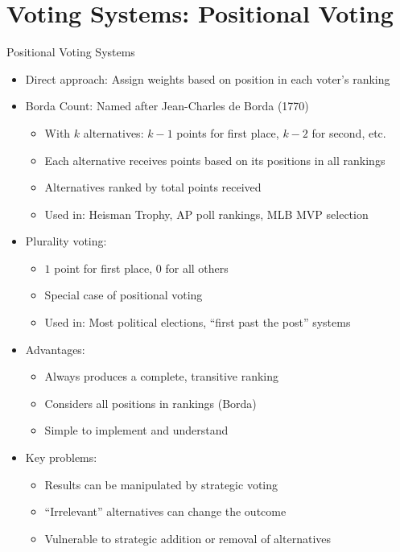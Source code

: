 \documentclass[10pt]{beamer}
\begin{document}
\section{Voting Systems: Positional Voting}

\begin{frame}{Positional Voting Systems}
  \begin{itemize}[<+->]
    \item Direct approach: Assign weights based on position in each voter's ranking
    \item Borda Count: Named after Jean-Charles de Borda (1770)
      \begin{itemize}
        \item With $k$ alternatives: $k-1$ points for first place, $k-2$ for second, etc.
        \item Each alternative receives points based on its positions in all rankings
        \item Alternatives ranked by total points received
        \item Used in: Heisman Trophy, AP poll rankings, MLB MVP selection
      \end{itemize}
    \item Plurality voting:
      \begin{itemize}
        \item $1$ point for first place, $0$ for all others
        \item Special case of positional voting
        \item Used in: Most political elections, ``first past the post'' systems
      \end{itemize}
    \item Advantages:
      \begin{itemize}
        \item Always produces a complete, transitive ranking
        \item Considers all positions in rankings (Borda)
        \item Simple to implement and understand
      \end{itemize}
    \item Key problems:
      \begin{itemize}
        \item Results can be manipulated by strategic voting
        \item ``Irrelevant'' alternatives can change the outcome
        \item Vulnerable to strategic addition or removal of alternatives
      \end{itemize}
  \end{itemize}
\end{frame}
\end{document}
